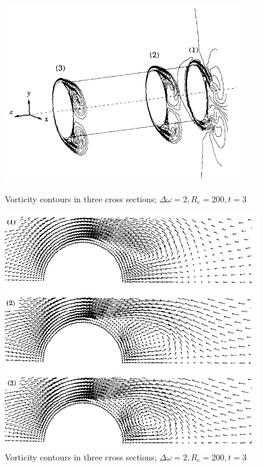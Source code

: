 \documentclass[11pt]{report}
\begin{document}
	\begin{figure}[!h]
		\centering
		\begin{minipage}{.4\textwidth}
			\centering
			\includegraphics[width=1\linewidth]{graph_7}
			\caption{Vorticity contours in three cross sections; $\Delta\omega = 2, R_e=200, t=3$}
			\label{fig:4_7}
		\end{minipage}
		\begin{minipage}{.4\textwidth}
			\centering
			\includegraphics[width=1.3\linewidth]{graph_8}
			\caption{Vorticity contours in three cross sections; $\Delta\omega = 2, R_e=200, t=3$}
			\label{fig:4_8}
		\end{minipage}
	\end{figure}
\end{document}
